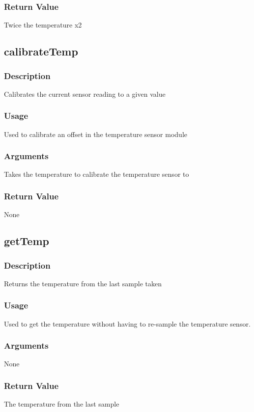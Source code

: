 \documentclass[]{report}
\begin{document}
\subsubsection{Return Value}
Twice the temperature x2

\subsection{calibrateTemp}
\subsubsection{Description}
Calibrates the current sensor reading to a given value

\subsubsection{Usage}
Used to calibrate an offset in the temperature sensor module

\subsubsection{Arguments}
Takes the temperature to calibrate the temperature sensor to

\subsubsection{Return Value}
None

\subsection{getTemp}
\subsubsection{Description}
Returns the temperature from the last sample taken

\subsubsection{Usage}
Used to get the temperature without having to re-sample the temperature sensor.

\subsubsection{Arguments}
None

\subsubsection{Return Value}
The temperature from the last sample
\end{document}
